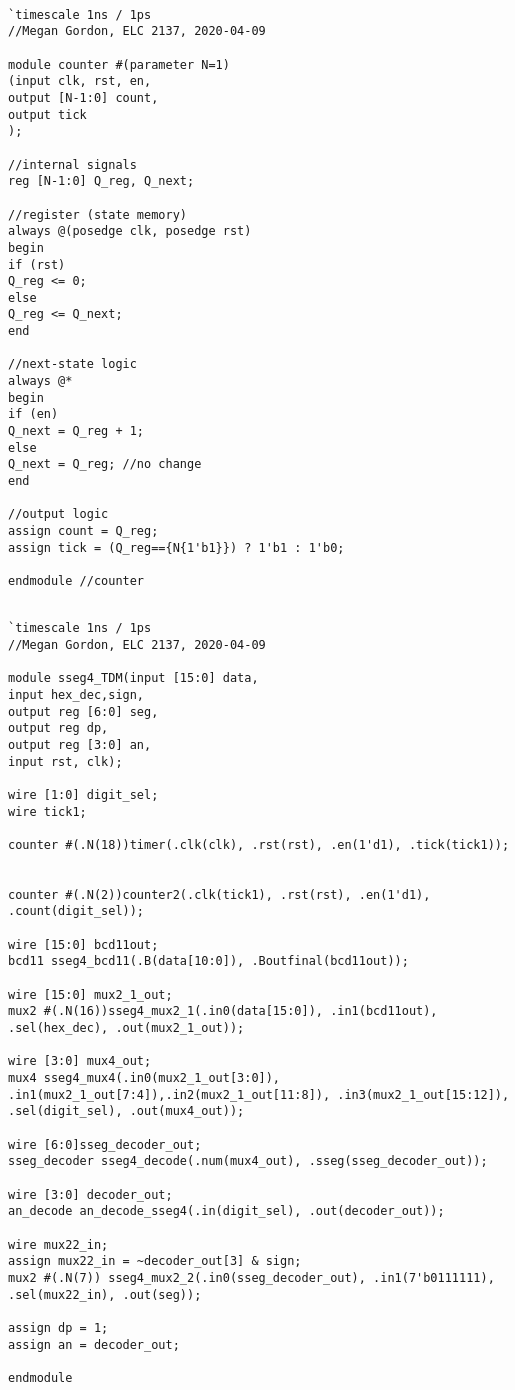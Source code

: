 \documentclass[11pt]{article}
\begin{document}
\begin{lstlisting}[style=Verilog,caption=Counter Code,label=code:ex ]

`timescale 1ns / 1ps
//Megan Gordon, ELC 2137, 2020-04-09

module counter #(parameter N=1)
(input clk, rst, en,
output [N-1:0] count,
output tick
);

//internal signals
reg [N-1:0] Q_reg, Q_next;

//register (state memory)
always @(posedge clk, posedge rst)
begin
if (rst)
Q_reg <= 0;
else
Q_reg <= Q_next;
end

//next-state logic
always @*
begin
if (en)
Q_next = Q_reg + 1;
else
Q_next = Q_reg; //no change
end

//output logic
assign count = Q_reg;
assign tick = (Q_reg=={N{1'b1}}) ? 1'b1 : 1'b0;

endmodule //counter

\end{lstlisting}

\begin{lstlisting}[style=Verilog,caption=7-Seg Multiplexer Code,label=code:ex ]

`timescale 1ns / 1ps
//Megan Gordon, ELC 2137, 2020-04-09

module sseg4_TDM(input [15:0] data,
input hex_dec,sign,
output reg [6:0] seg,
output reg dp,
output reg [3:0] an,
input rst, clk);

wire [1:0] digit_sel;
wire tick1;

counter #(.N(18))timer(.clk(clk), .rst(rst), .en(1'd1), .tick(tick1));


counter #(.N(2))counter2(.clk(tick1), .rst(rst), .en(1'd1), .count(digit_sel));

wire [15:0] bcd11out;
bcd11 sseg4_bcd11(.B(data[10:0]), .Boutfinal(bcd11out));

wire [15:0] mux2_1_out;
mux2 #(.N(16))sseg4_mux2_1(.in0(data[15:0]), .in1(bcd11out), .sel(hex_dec), .out(mux2_1_out));

wire [3:0] mux4_out;
mux4 sseg4_mux4(.in0(mux2_1_out[3:0]), .in1(mux2_1_out[7:4]),.in2(mux2_1_out[11:8]), .in3(mux2_1_out[15:12]), .sel(digit_sel), .out(mux4_out));

wire [6:0]sseg_decoder_out;
sseg_decoder sseg4_decode(.num(mux4_out), .sseg(sseg_decoder_out));

wire [3:0] decoder_out;
an_decode an_decode_sseg4(.in(digit_sel), .out(decoder_out));

wire mux22_in; 
assign mux22_in = ~decoder_out[3] & sign; 
mux2 #(.N(7)) sseg4_mux2_2(.in0(sseg_decoder_out), .in1(7'b0111111), .sel(mux22_in), .out(seg));

assign dp = 1;
assign an = decoder_out;

endmodule

\end{lstlisting}
\end{document}

